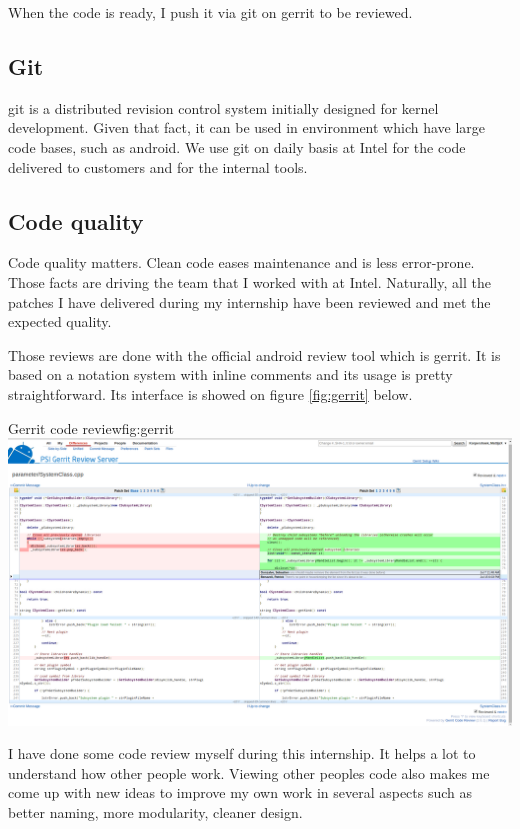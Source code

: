 When the code is ready, I push it via \gls{git} on \gls{gerrit} to be reviewed.

\subsection{Git}
\gls{git} is a distributed revision control system initially designed for kernel
development. Given that fact, it can be used in environment which have large
code bases, such as \gls{android}. We use \gls{git} on daily basis at Intel for the
code delivered to customers and for the internal tools.

\subsection{Code quality}
Code quality matters. Clean code eases maintenance and is less error-prone.
Those facts are driving the team that I worked with at Intel. Naturally, all the
patches I have delivered during my internship have been reviewed and met the
expected quality.

Those reviews are done with the official \gls{android} review tool which is \gls{gerrit}.
It is based on a notation system with inline comments and its usage is pretty straightforward.
Its interface is showed on figure \ref{fig:gerrit} below.

\begin{figureGraphics}{Gerrit code review}{fig:gerrit}
    \includegraphics[width=\textwidth]{./src/img/gerrit.png}
\end{figureGraphics}

I have done some code review myself during this internship. It helps a lot to
understand how other people work. Viewing other peoples code also makes me come
up with new ideas to improve my own work in several aspects such as better naming,
more modularity, cleaner design.


